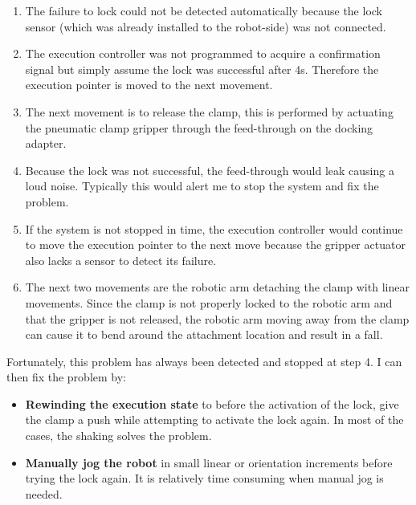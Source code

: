 \begin{enumerate}
	\item The failure to lock could not be detected automatically because the lock sensor (which was already installed to the robot-side) was not connected.

	\item The execution controller was not programmed to acquire a confirmation signal but simply assume the lock was successful after 4s. Therefore the execution pointer is moved to the next movement.

	\item The next movement is to release the clamp, this is performed by actuating the pneumatic clamp gripper through the feed-through on the docking adapter.

	\item Because the lock was not successful, the feed-through would leak causing a loud noise. Typically this would alert me to stop the system and fix the problem.

	\item If the system is not stopped in time, the execution controller would continue to move the execution pointer to the next move because the gripper actuator also lacks a sensor to detect its failure.

	\item The next two movements are the robotic arm detaching the clamp with linear movements. Since the clamp is not properly locked to the robotic arm and that the gripper is not released, the robotic arm moving away from the clamp can cause it to bend around the attachment location and result in a fall.

\end{enumerate}

Fortunately, this problem has always been detected and stopped at step 4. I can then fix the problem by:

\begin{itemize}
	\item \textbf{Rewinding the execution state }to before the activation of the lock, give the clamp a push while attempting to activate the lock again. In most of the cases, the shaking solves the problem.

	\item \textbf{Manually jog the robot} in small linear or orientation increments before trying the lock again. It is relatively time consuming when manual jog is needed.

\end{itemize}
